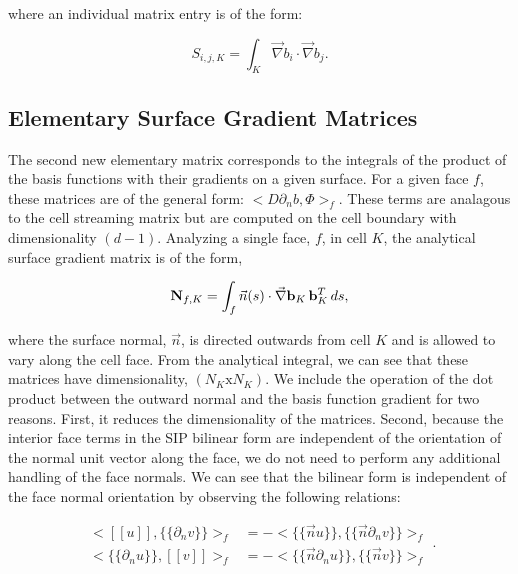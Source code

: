 \noindent where an individual matrix entry is of the form:

\begin{equation}
\label{eq::DSA_stiffness_matrix_entry}
S_{i,j,K} =  \int_K \vec{\nabla}b_i \cdot \vec{\nabla} b_j .
\end{equation}

\subsection{Elementary Surface Gradient Matrices}
\label{sec::DSA_SIP_SurfaceGradient}

The second new elementary matrix corresponds to the integrals of the product of the basis functions with their gradients on a given surface. For a given face $f$, these matrices are of the general form: $\Big<  D \partial_n b, \Phi \Big>_f$. These terms are analagous to the cell streaming matrix but are computed on the cell boundary with dimensionality $(d-1)$. Analyzing a single face, $f$, in cell $K$, the analytical surface gradient matrix is of the form,

\begin{equation}
\label{eq::DSA_surface_gradient_matrix_analytical}
{\bf N}_{f,K}  =    \int_f \vec{n} (s) \cdot \vec{\nabla} {\bf b}_K \, {\bf b}_K^T \, d s ,
\end{equation}

\noindent where the surface normal, $\vec{n}$, is directed outwards from cell $K$ and is allowed to vary along the cell face. From the analytical integral, we can see that these matrices have dimensionality, $(N_K \text{x} N_K )$. We include the operation of the dot product between the outward normal and the basis function gradient for two reasons. First, it reduces the dimensionality of the matrices. Second, because the interior face terms in the SIP bilinear form are independent of the orientation of the normal unit vector along the face, we do not need to perform any additional handling of the face normals. We can see that the bilinear form is independent of the face normal orientation by observing the following relations:

\begin{equation}
\label{eq::DSA_outward_normal_notes}
\begin{aligned}
\Big<  [\![   u ]\!] , \{\!\{   \partial_n v \}\!\}\Big>_{f}  &= - \Big<  \{\!\{ \vec{n}  u \}\!\} , \{\!\{  \vec{n} \partial_n v \}\!\}\Big>_{f} \\
\Big< \{\!\{   \partial_n u \}\!\} ,  [\![   v ]\!]\Big>_{f} &= - \Big<  \{\!\{ \vec{n} \partial_n  u \}\!\} , \{\!\{  \vec{n} v \}\!\}\Big>_{f}
\end{aligned}.
\end{equation}

